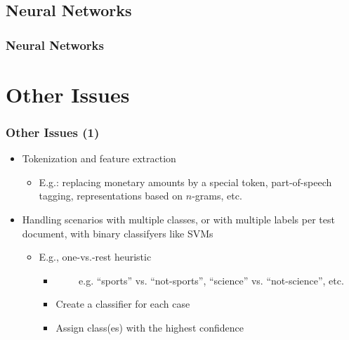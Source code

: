 \documentclass{beamer}
\begin{document}


\subsection{Neural Networks}

\begin{frame}
    \frametitle{Neural Networks}
\end{frame}


\section{Other Issues}

\begin{frame}
    \frametitle{Other Issues (1)}

    \begin{itemize}
    \item Tokenization and feature extraction
        \begin{itemize}
        \item E.g.: replacing monetary amounts by a special token, part-of-speech tagging, representations based on $n$-grams, etc.
        \end{itemize}
    
    \item Handling scenarios with multiple classes, or with multiple labels per test document, with binary classifyers like SVMs
        \begin{itemize}
        \item E.g., one-vs.-rest heuristic
            \begin{itemize}
            \item {\scriptsize ~~~~ e.g. ``sports'' vs. ``not-sports'', ``science'' vs.
                  ``not-science'', etc.}
            \item Create a classifier for each case
            \item Assign class(es) with the highest confidence
            \end{itemize}
        \end{itemize}
    \end{itemize}
\end{frame}
\end{document}
